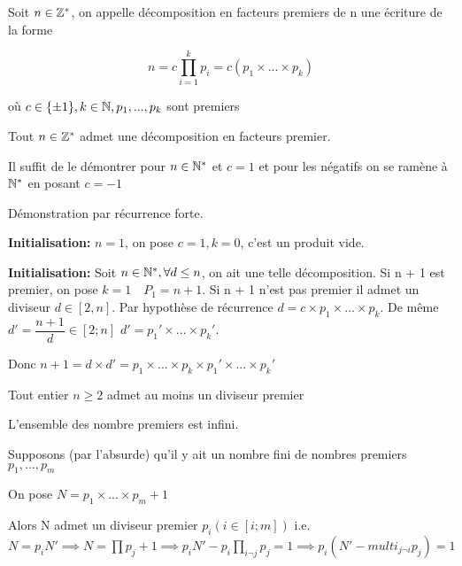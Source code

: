 \documentclass[a4paper, 12pt]{article}
\begin{document}
\begin{definition}
    Soit $n \in \mathbb{Z}^*$, on appelle décomposition en facteurs premiers de n une écriture de la forme

    $$
    n = c \prod_{i=1}^{k} p_i = c(p_1 \times ... \times p_k)
    $$

    où $c \in \{\pm 1\}, k \in \mathbb{N}, p_1,...,p_k$ sont premiers
\end{definition}

\begin{proposition}
    Tout $n \in \mathbb{Z}^*$ admet une décomposition en facteurs premier.
\end{proposition}

\begin{demonstration}
    Il suffit de le démontrer pour $n \in \mathbb{N}^*$ et $c = 1$ et pour les négatifs on se ramène à $\mathbb{N}^*$ en posant $c = -1$

    Démonstration par récurrence forte.

    \textbf{Initialisation:} $n = 1$, on pose $c = 1, k = 0$, c'est un produit vide.

    \textbf{Initialisation:} Soit $n \in \mathbb{N}^*, \forall d \leq n$, on ait une telle décomposition.
    Si n + 1 est premier, on pose $k = 1 \quad P_1 = n + 1$.
    Si n + 1 n'est pas premier il admet un diviseur $d \in [2, n]$.
    Par hypothèse de récurrence $d = c \times p_1 \times ... \times p_k$.
    De même $d' = \dfrac{n+1}{d} \in [2; n]$
    $d' = p_1' \times ... \times p_k'$.

    Donc $n + 1 = d \times d' = p_1 \times ... \times p_k \times p_1' \times ... \times p_k'$
\end{demonstration}

\begin{corollaire}
    Tout entier $n \geq 2$ admet au moins un diviseur premier
\end{corollaire}

\begin{proposition}
    L'ensemble des nombre premiers est infini.
\end{proposition}

\begin{demonstration}
    Supposons (par l'absurde) qu'il y ait un nombre fini de nombres premiers $p_1, ..., p_m$

    On pose $N = p_1 \times ... \times p_m + 1$

    Alors N admet un diviseur premier $p_i (i \in [i; m])$
    i.e. $N = p_i N' \implies N = \prod p_j + 1 \implies p_i N' - p_i \prod_{i \neg j} p_j = 1 \implies p_i (N' - multi_{j \neg i} p_j) = 1$
\end{demonstration}
\end{document}
